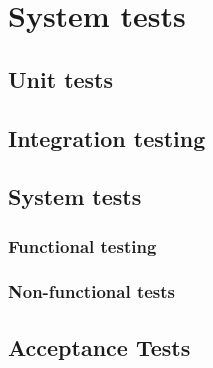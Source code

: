 \chapter{System tests}

\section{Unit tests}


\section{Integration testing}


\section{System tests}


\subsection{Functional testing}


\subsection{Non-functional tests}


\section{Acceptance Tests}